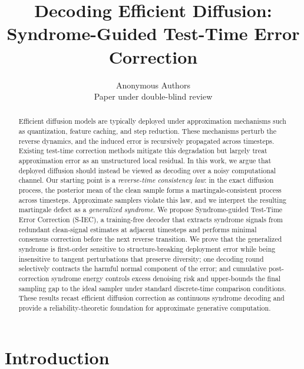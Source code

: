 \documentclass{article}
\title{Decoding Efficient Diffusion: Syndrome-Guided Test-Time Error Correction}
\author{%
  Anonymous Authors \\
  Paper under double-blind review
}
\theoremstyle{plain}
\theoremstyle{definition}
\theoremstyle{remark}
\newcommand{\SIEC}{\texorpdfstring{S\mbox{-}IEC\xspace}{S-IEC }}
\begin{document}
\maketitle

\begin{abstract}
Efficient diffusion models are typically deployed under approximation mechanisms
such as quantization, feature caching, and step reduction. These mechanisms
perturb the reverse dynamics, and the induced error is recursively propagated
across timesteps. Existing test-time correction methods mitigate this
degradation but largely treat approximation error as an unstructured local
residual. In this work, we argue that deployed diffusion should instead be
viewed as decoding over a noisy computational channel. Our starting point is a
\emph{reverse-time consistency law}: in the exact diffusion process, the
posterior mean of the clean sample forms a martingale-consistent process across
timesteps. Approximate samplers violate this law, and we interpret the
resulting martingale defect as a \emph{generalized syndrome}. We propose
Syndrome-guided Test-Time Error Correction (\SIEC), a training-free
decoder that extracts syndrome signals from redundant clean-signal estimates
at adjacent timesteps and performs minimal consensus correction before the
next reverse transition. We prove that the generalized syndrome is first-order
sensitive to structure-breaking deployment error while being insensitive to
tangent perturbations that preserve diversity; one decoding round selectively
contracts the harmful normal component of the error; and cumulative
post-correction syndrome energy controls excess denoising risk and
upper-bounds the final sampling gap to the ideal sampler under standard
discrete-time comparison conditions. These results recast efficient diffusion
correction as continuous syndrome decoding and provide a reliability-theoretic
foundation for approximate generative computation.
\end{abstract}

\section{Introduction}
\label{sec:introduction}
\end{document}
